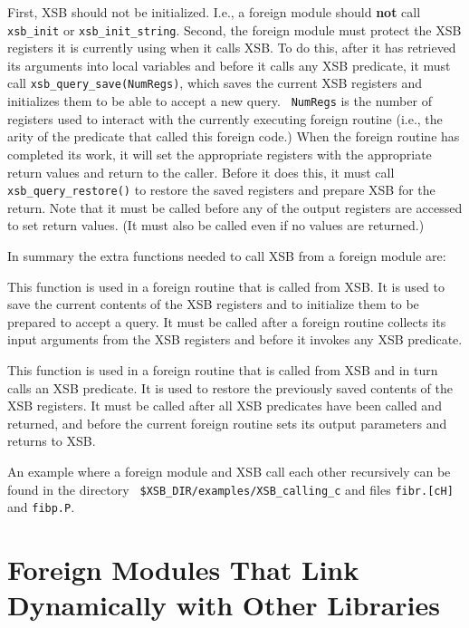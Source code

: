 First, XSB should not be initialized.  I.e., a foreign module should
{\bf not} call {\tt xsb\_init} or {\tt xsb\_init\_string}.  Second, the
foreign module must protect the XSB registers it is currently using
when it calls XSB.  To do this, after it has retrieved its arguments
into local variables and before it calls any XSB predicate, it must
call {\tt xsb\_query\_save(NumRegs)}, which saves the current XSB
registers and initializes them to be able to accept a new query.  {\tt
NumRegs} is the number of registers used to interact with the
currently executing foreign routine (i.e., the arity of the predicate
that called this foreign code.)  When the foreign routine has
completed its work, it will set the appropriate registers with the
appropriate return values and return to the caller.  Before it does
this, it must call {\tt xsb\_query\_restore()} to restore the saved
registers and prepare XSB for the return.  Note that it must be called
before any of the output registers are accessed to set return values.
(It must also be called even if no values are returned.)

In summary the extra functions needed to call XSB from a foreign
module are:

\begin{description}

 This function is used in a foreign
routine that is called from XSB.  It is used to save the current
contents of the XSB registers and to initialize them to be prepared to
accept a query.  It must be called after a foreign routine collects its
input arguments from the XSB registers and before it invokes any XSB
predicate.

 This function is used in a foreign
routine that is called from XSB and in turn calls an XSB predicate.
It is used to restore the previously saved contents of the XSB
registers.  It must be called after all XSB predicates have been
called and returned, and before the current foreign routine sets its
output parameters and returns to XSB.

\end{description}

An example where a foreign module and XSB call each other recursively
can be found in the directory {\tt
  \$XSB\_DIR/examples/XSB\_calling\_c} and files {\tt fibr.[cH]} and
{\tt fibp.P}.


\section{Foreign Modules That Link Dynamically with Other Libraries}

